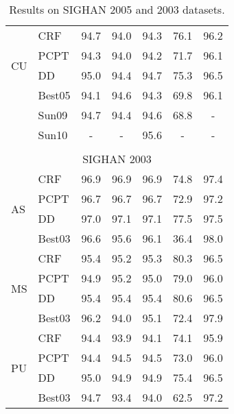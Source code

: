 \begin{table}
\begin{small}
\begin{tabular}{ l | l | c | c | c | c | c   }
\multirow{4}{*}{CU}  & CRF       & 94.7 & 94.0 &  94.3  & {76.1} & 96.2 \\
& PCPT & 94.3 & 94.0 & 94.2  & 71.7  & 96.1  \\
& DD & {95.0} & 94.4 & {94.7}  & {75.3} & {96.5}  \\
& Best05      &  94.1 &  {94.6} & 94.3  & 69.8 & 96.1 \\
& Sun09      & 94.7   & 94.4  & 94.6  &   68.8  & - \\
& Sun10      & -   & -  & 95.6  &   -  & - \\
\hline

\multicolumn{7}{c}{} \\
\multicolumn{7}{c}{\large{SIGHAN 2003}} \\
\hline

\multirow{4}{*}{AS} & CRF    & 96.9 & 96.9 & 96.9  & 74.8 &  97.4 \\
& PCPT &  96.7 & 96.7 & 96.7  & 72.9  & 97.2 \\
& DD & {97.0} & {97.1} & {97.1}  & {77.5}  & 97.5 \\
 &  Best03     & 96.6     & 95.6 &  96.1  & 36.4 &  {98.0} \\
\hline
\multirow{4}{*}{MS}  & CRF     &  95.4 & 95.2 & 95.3  & 80.3	 & 96.5 \\
& PCPT &  94.9 & 95.2 & 95.0  & 79.0  & 96.0 \\
& DD &  95.4 & {95.4} & {95.4}	  & {80.6} & 96.5 \\
&  Best03        &   {96.2} &   94.0&  95.1  & 72.4 & {97.9} \\
\hline
\multirow{4}{*}{PU} & CRF       &  94.4 & 93.9 & 94.1   & 74.1   & 95.9 \\
& PCPT &  94.4 & 94.5 & 94.5   & 73.0  &  96.0 \\
& DD &  {95.0} & {94.9} & {94.9}  & {75.4} &  96.5 \\
&  Best03   &  94.7   & 93.4  & 94.0   &  62.5  &  {97.2} \\

\end{tabular} 
\caption{Results on SIGHAN 2005 and 2003 datasets. }\label{tbl:results}
\end{small}
\end{table}

